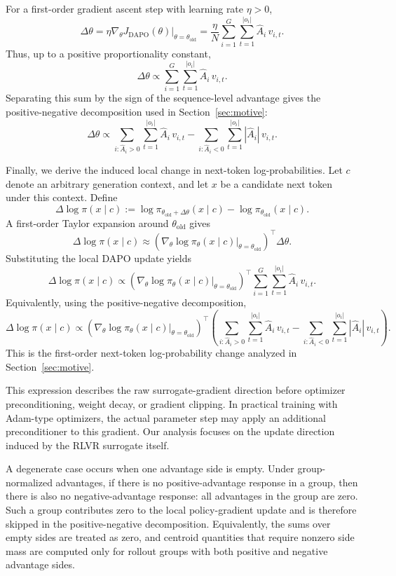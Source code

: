 \documentclass{article} %
\begin{document}
For a first-order gradient ascent step with learning rate \(\eta>0\),
\[
\Delta\theta
=
\eta
\nabla_\theta J_{\mathrm{DAPO}}(\theta)\Big|_{\theta=\theta_{\mathrm{old}}}
=
\frac{\eta}{N}
\sum_{i=1}^G \sum_{t=1}^{|o_i|}
\hat A_i\,v_{i,t}.
\]
Thus, up to a positive proportionality constant,
\[
\Delta\theta
\propto
\sum_{i=1}^G \sum_{t=1}^{|o_i|}
\hat A_i\,v_{i,t}.
\]
Separating this sum by the sign of the sequence-level advantage gives the
positive-negative decomposition used in Section~\ref{sec:motive}:
\[
\Delta\theta
\propto
\sum_{i:\hat A_i>0}\sum_{t=1}^{|o_i|}
\hat A_i\,v_{i,t}
-
\sum_{i:\hat A_i<0}\sum_{t=1}^{|o_i|}
|\hat A_i|\,v_{i,t}.
\]

Finally, we derive the induced local change in next-token log-probabilities.
Let \(c\) denote an arbitrary generation context, and let \(x\) be a candidate
next token under this context. Define
\[
\Delta \log \pi(x\mid c)
:=
\log \pi_{\theta_{\mathrm{old}}+\Delta\theta}(x\mid c)
-
\log \pi_{\theta_{\mathrm{old}}}(x\mid c).
\]
A first-order Taylor expansion around \(\theta_{\mathrm{old}}\) gives
\[
\Delta \log \pi(x\mid c)
\approx
\left(
\nabla_\theta
\log \pi_\theta(x\mid c)
\Big|_{\theta=\theta_{\mathrm{old}}}
\right)^{\top}
\Delta\theta.
\]
Substituting the local DAPO update yields
\[
\Delta \log \pi(x\mid c)
\propto
\left(
\nabla_\theta
\log \pi_\theta(x\mid c)
\Big|_{\theta=\theta_{\mathrm{old}}}
\right)^{\top}
\sum_{i=1}^G \sum_{t=1}^{|o_i|}
\hat A_i\,v_{i,t}.
\]
Equivalently, using the positive-negative decomposition,
\[
\Delta \log \pi(x\mid c)
\propto
\left(
\nabla_\theta
\log \pi_\theta(x\mid c)
\Big|_{\theta=\theta_{\mathrm{old}}}
\right)^{\top}
\left(
\sum_{i:\hat A_i>0}\sum_{t=1}^{|o_i|}
\hat A_i\,v_{i,t}
-
\sum_{i:\hat A_i<0}\sum_{t=1}^{|o_i|}
|\hat A_i|\,v_{i,t}
\right).
\]
This is the first-order next-token log-probability change analyzed in Section~\ref{sec:motive}.

This expression describes the raw surrogate-gradient direction before optimizer
preconditioning, weight decay, or gradient clipping. In practical training with
Adam-type optimizers, the actual parameter step may apply an additional
preconditioner to this gradient. Our analysis focuses on the update direction
induced by the RLVR surrogate itself.

A degenerate case occurs when one advantage side is empty. Under group-normalized advantages, if there is no positive-advantage response in a group, then there is also no negative-advantage response: all advantages in the group are zero. Such a group contributes zero to the local policy-gradient update and is therefore skipped in the positive-negative decomposition. Equivalently, the sums over empty sides are treated as zero, and centroid quantities that require nonzero side mass are computed only for rollout groups with both positive and negative advantage sides.
\end{document}
